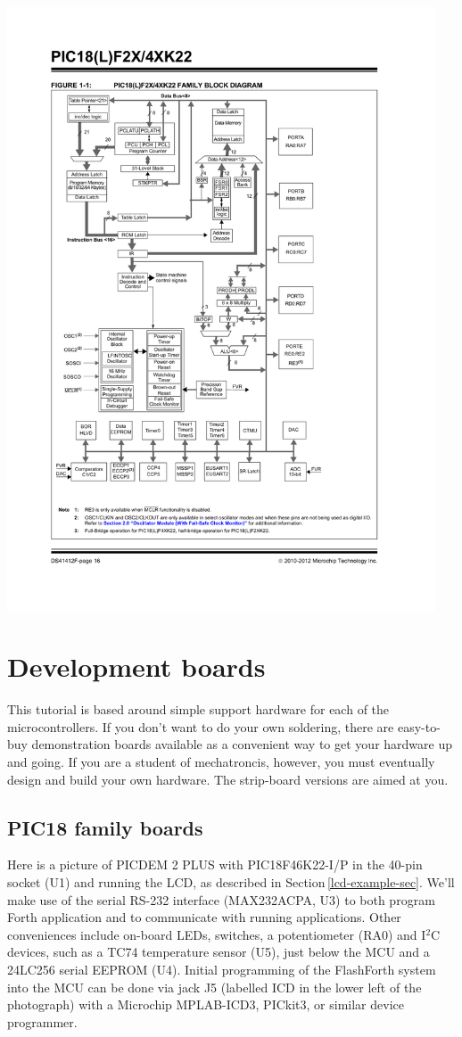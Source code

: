 \documentclass[12pt,a4paper]{article}
\begin{document}
\newpage
\includegraphics[width=0.95\textwidth,viewport=57 64 518 781,clip=true]{../figs/pic18f26k22-block-diagram-from-datasheet.pdf}

 
\newpage
\section{Development boards}
%
This tutorial is based around simple support hardware for each of the microcontrollers.
If you don't want to do your own soldering, there are easy-to-buy demonstration boards 
available as a convenient way to get your hardware up and going.
If you are a student of mechatroncis, however, you must eventually design and build your own hardware.  
The strip-board versions are aimed at you.

\medskip
\subsection{PIC18 family boards}
%
Here is a picture of PICDEM 2 PLUS with PIC18F46K22-I/P in the 40-pin socket (U1)
and running the LCD, as described in Section\,\ref{lcd-example-sec}.
We'll make use of the serial RS-232 interface (MAX232ACPA, U3) to both program Forth application and 
to communicate with running applications.
Other conveniences include on-board LEDs, switches, a potentiometer (RA0) 
and I$^2$C devices, such as a TC74 temperature sensor (U5), just below the MCU
and a 24LC256 serial EEPROM (U4).
Initial programming of the FlashForth system into the MCU can be done via jack J5 
(labelled ICD in the lower left of the photograph)
with a Microchip MPLAB-ICD3, PICkit3, or similar device programmer.
\end{document}
